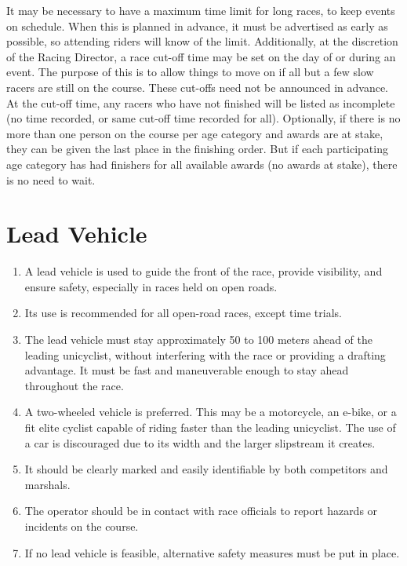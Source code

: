 It may be necessary to have a maximum time limit for long races, to keep events on schedule.
When this is planned in advance, it must be advertised as early as possible, so attending riders will know of the limit.
Additionally, at the discretion of the Racing Director, a race cut-off time may be set on the day of or during an event.
The purpose of this is to allow things to move on if all but a few slow racers are still on the course.
These cut-offs need not be announced in advance.
At the cut-off time, any racers who have not finished will be listed as incomplete (no time recorded, or same cut-off time recorded for all).
Optionally, if there is no more than one person on the course per age category and awards are at stake, they can be given the last place in the finishing order.
But if each participating age category has had finishers for all available awards (no awards at stake), there is no need to wait.

\section{Lead Vehicle}

\begin{enumerate}[leftmargin=1.5em,labelsep=*]
	\item A lead vehicle is used to guide the front of the race, provide visibility, and ensure safety, especially in races held on open roads.
	\item Its use is recommended for all open-road races, except time trials.
	\item The lead vehicle must stay approximately 50 to 100 meters ahead of the leading unicyclist, without interfering with the race or providing a drafting advantage.
	It must be fast and maneuverable enough to stay ahead throughout the race.
	\item A two-wheeled vehicle is preferred.
	This may be a motorcycle, an e-bike, or a fit elite cyclist capable of riding faster than the leading unicyclist.
	The use of a car is discouraged due to its width and the larger slipstream it creates.
	\item It should be clearly marked and easily identifiable by both competitors and marshals.
	\item The operator should be in contact with race officials to report hazards or incidents on the course.
	\item If no lead vehicle is feasible, alternative safety measures must be put in place.
\end{enumerate}

